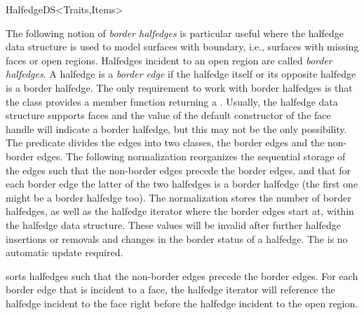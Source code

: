 \begin{ccRefConcept}{HalfedgeDS<Traits,Items>}
\ccGlue
{}
\ccGlue
{}
\ccGlue
\ccMethod{void faces_erase( Face_handle first, Face_handle last);}{
    removes the range of faces $[\ccc{first},\ccc{last})$ if faces are 
    supported and \ccc{Supports_removal} $\equiv$ \ccc{CGAL::Tag_true}.}



\begin{ccAdvanced}
  
The following notion of {\em border halfedges\/} is particular useful
where the halfedge data structure is used to model surfaces with
boundary, i.e., surfaces with missing faces or open regions. Halfedges
incident to an open region are called {\em border halfedges}. A
halfedge is a {\em border edge\/} if the halfedge itself or its
opposite halfedge is a border halfedge. The only requirement to work
with border halfedges is that the
 class provides a member function 
returning a . Usually, the halfedge data structure
supports faces and the value of the default constructor of the face
handle will indicate a border halfedge, but this may not be the only
possibility. The  predicate divides the edges into
two classes, the border edges and the non-border edges. The
following normalization reorganizes the sequential storage of the
edges such that the non-border edges precede the border edges, and
that for each border edge the latter of the two halfedges is a
border halfedge (the first one might be a border halfedge too). The
normalization stores the number of border halfedges, as well as the
halfedge iterator where the border edges start at, within the
halfedge data structure.  These values will be invalid after further
halfedge insertions or removals and changes in the border status of 
a halfedge. The is no automatic update required.


    {sorts halfedges such that the non-border edges precede the
     border edges. For each border edge that is incident to a face,
     the halfedge iterator will reference the halfedge incident to the
     face right before the halfedge incident to the open region.}


\end{ccAdvanced}
\end{ccRefConcept}

